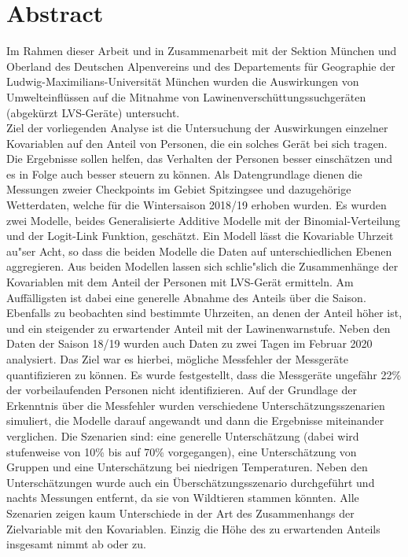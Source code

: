 \documentclass[12pt]{scrreprt}
\begin{document}
\chapter*{Abstract}
{\footnotesize Im Rahmen dieser Arbeit und in Zusammenarbeit mit der Sektion München und Oberland des Deutschen Alpenvereins und des Departements für Geographie der Ludwig-Maximilians-Universität München wurden die Auswirkungen von Umwelteinflüssen auf die Mitnahme von Lawinenverschüttungssuchgeräten (abgekürzt LVS-Geräte) untersucht. \\
Ziel der vorliegenden Analyse ist die Untersuchung der Auswirkungen einzelner Kovariablen auf den Anteil von Personen, die ein solches Gerät bei sich tragen.
Die Ergebnisse sollen helfen, das Verhalten der Personen besser einschätzen und es in Folge auch besser steuern zu können. Als Datengrundlage dienen die Messungen zweier Checkpoints im Gebiet Spitzingsee und dazugehörige Wetterdaten, welche für die Wintersaison 2018/19 erhoben wurden.
Es wurden zwei Modelle, beides Generalisierte Additive Modelle mit der Binomial-Verteilung und der Logit-Link Funktion, geschätzt. Ein Modell lässt die Kovariable Uhrzeit au"ser Acht, so dass die beiden Modelle die Daten auf unterschiedlichen Ebenen aggregieren. Aus beiden Modellen lassen sich schlie"slich die Zusammenhänge der Kovariablen mit dem Anteil der Personen mit LVS-Gerät ermitteln. Am Auffälligsten ist dabei eine generelle Abnahme des Anteils über die Saison. Ebenfalls zu beobachten sind bestimmte Uhrzeiten, an denen der Anteil höher ist, und ein steigender zu erwartender Anteil mit der Lawinenwarnstufe.
Neben den Daten der Saison 18/19 wurden auch Daten zu zwei Tagen im Februar 2020 analysiert. Das Ziel war es hierbei, mögliche Messfehler der Messgeräte quantifizieren zu können. Es wurde festgestellt, dass die Messgeräte ungefähr 22\% der vorbeilaufenden Personen nicht identifizieren.
Auf der Grundlage der Erkenntnis über die Messfehler wurden verschiedene Unterschätzungsszenarien simuliert, die Modelle darauf angewandt und dann die Ergebnisse miteinander verglichen. Die Szenarien sind: eine generelle Unterschätzung (dabei wird stufenweise von 10\% bis auf 70\% vorgegangen), eine Unterschätzung von Gruppen und eine Unterschätzung bei niedrigen Temperaturen. Neben den Unterschätzungen wurde auch ein Überschätzungsszenario durchgeführt und nachts Messungen entfernt, da sie von Wildtieren stammen könnten. Alle Szenarien zeigen kaum Unterschiede in der Art des Zusammenhangs der Zielvariable mit den Kovariablen. Einzig die Höhe des zu erwartenden Anteils insgesamt nimmt ab oder zu.}
\end{document}
